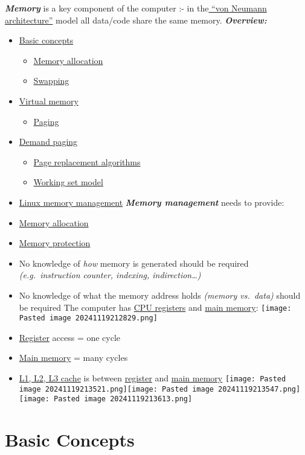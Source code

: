 \textbf{\textit{Memory}} is a key component of the computer :- in
the\ul{ ``von Neumann architecture''} model all data/code share the same
memory. \textbf{\textit{Overview:}}

\begin{itemize}
\tightlist
\item
  \ul{Basic concepts}

  \begin{itemize}
  \tightlist
  \item
    \ul{Memory allocation}
  \item
    \ul{Swapping}
  \end{itemize}
\item
  \ul{Virtual memory}

  \begin{itemize}
  \tightlist
  \item
    \ul{Paging}
  \end{itemize}
\item
  \ul{Demand paging}

  \begin{itemize}
  \tightlist
  \item
    \ul{Page replacement algorithms}
  \item
    \ul{Working set model}
  \end{itemize}
\item
  \ul{Linux memory management} \textbf{\textit{Memory management}} needs
  to provide:
\item
  \ul{Memory allocation}
\item
  \ul{Memory protection}
\item
  No knowledge of \textit{how} memory is generated should be required
  \textit{(e.g.~instruction counter, indexing, indirection\ldots)}
\item
  No knowledge of what the memory address holds \textit{(memory
  vs.~data)} should be required The computer has \ul{CPU registers} and
  \ul{main memory}: \texttt{[image: Pasted image 20241119212829.png]}
\item
  \ul{Register} access = one cycle
\item
  \ul{Main memory} = many cycles
\item
  \ul{L1, L2, L3 cache} is between \ul{register} and \ul{main memory}
  \texttt{[image: Pasted image 20241119213521.png]}\texttt{[image: Pasted image 20241119213547.png]}\texttt{[image: Pasted image 20241119213613.png]}
\end{itemize}

\section*{Basic Concepts}

